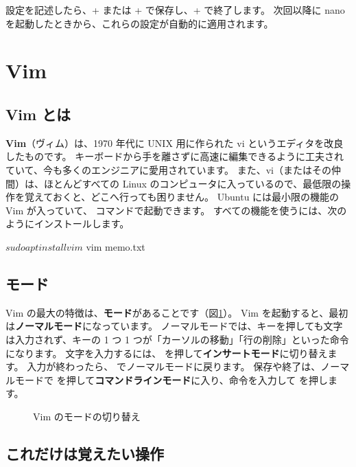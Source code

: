 設定を記述したら、+ または + で保存し、+ で終了します。
次回以降に nano を起動したときから、これらの設定が自動的に適用されます。


\section{Vim}
\label{sec:editor-vim}

\subsection{Vim とは}

\textbf{Vim}（ヴィム）は、1970 年代に UNIX 用に作られた vi というエディタを改良したものです。
キーボードから手を離さずに高速に編集できるように工夫されていて、今も多くのエンジニアに愛用されています。
また、vi（またはその仲間）は、ほとんどすべての Linux のコンピュータに入っているので、最低限の操作を覚えておくと、どこへ行っても困りません。
Ubuntu には最小限の機能の Vim が入っていて、 コマンドで起動できます。
すべての機能を使うには、次のようにインストールします。

\begin{terminal}
$ sudo apt install vim
$ vim memo.txt
\end{terminal}

\subsection{モード}

Vim の最大の特徴は、\textbf{モード}があることです（図\ref{fig:editor-vim-modes}）。
Vim を起動すると、最初は\textbf{ノーマルモード}になっています。
ノーマルモードでは、キーを押しても文字は入力されず、キーの 1 つ 1 つが「カーソルの移動」「行の削除」といった命令になります。
文字を入力するには、 を押して\textbf{インサートモード}に切り替えます。
入力が終わったら、 でノーマルモードに戻ります。
保存や終了は、ノーマルモードで \key{:} を押して\textbf{コマンドラインモード}に入り、命令を入力して  を押します。

\begin{figure}[tb]
  \centering
  
  \caption{Vim のモードの切り替え}
  \label{fig:editor-vim-modes}
\end{figure}

\subsection{これだけは覚えたい操作}

